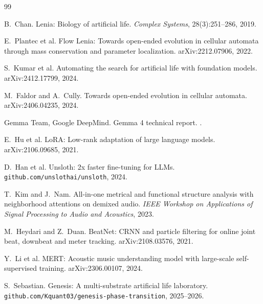 \documentclass[11pt]{article}
\begin{document}
\begin{thebibliography}{99}
\small

B.~Chan.
\newblock Lenia: Biology of artificial life.
\newblock \emph{Complex Systems}, 28(3):251--286, 2019.

E.~Plantec et al.
\newblock Flow Lenia: Towards open-ended evolution in cellular automata
through mass conservation and parameter localization.
\newblock arXiv:2212.07906, 2022.

S.~Kumar et al.
\newblock Automating the search for artificial life with foundation models.
\newblock arXiv:2412.17799, 2024.

M.~Faldor and A.~Cully.
\newblock Towards open-ended evolution in cellular automata.
\newblock arXiv:2406.04235, 2024.

Gemma Team, Google DeepMind.
\newblock Gemma 4 technical report.
.

E.~Hu et al.
\newblock LoRA: Low-rank adaptation of large language models.
\newblock arXiv:2106.09685, 2021.

D.~Han et al.
\newblock Unsloth: 2x faster fine-tuning for LLMs.
\newblock \texttt{github.com/unslothai/unsloth}, 2024.

T.~Kim and J.~Nam.
\newblock All-in-one metrical and functional structure analysis with
neighborhood attentions on demixed audio.
\newblock \emph{IEEE Workshop on Applications of Signal Processing to Audio
and Acoustics}, 2023.

M.~Heydari and Z.~Duan.
\newblock BeatNet: CRNN and particle filtering for online joint beat,
downbeat and meter tracking.
\newblock arXiv:2108.03576, 2021.

Y.~Li et al.
\newblock MERT: Acoustic music understanding model with large-scale
self-supervised training.
\newblock arXiv:2306.00107, 2024.

S.~Sebastian.
\newblock Genesis: A multi-substrate artificial life laboratory.
\newblock \texttt{github.com/Kquant03/genesis-phase-transition}, 2025--2026.

\end{thebibliography}
\end{document}

